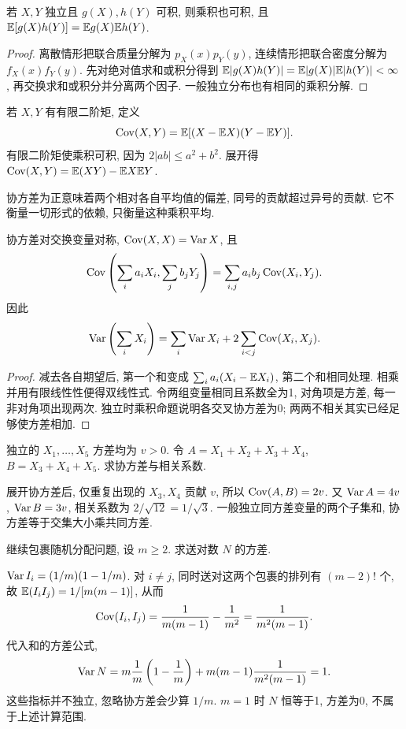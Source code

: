 \begin{proposition}[独立变量的乘积]
若 $X,Y$ 独立且 $g(X),h(Y)$ 可积, 则乘积也可积, 且
$\mathbb E[g(X)h(Y)]=\mathbb E g(X)\mathbb E h(Y)$.
\end{proposition}
\begin{proof}
离散情形把联合质量分解为 $p_X(x)p_Y(y)$, 连续情形把联合密度分解为 $f_X(x)f_Y(y)$. 先对绝对值求和或积分得到 $\mathbb E|g(X)h(Y)|=\mathbb E|g(X)|\mathbb E|h(Y)|<\infty$, 再交换求和或积分并分离两个因子. 一般独立分布也有相同的乘积分解.
\end{proof}
\begin{definition}[协方差]
若 $X,Y$ 有有限二阶矩, 定义
\[\operatorname{Cov}(X,Y)=\mathbb E[(X-\mathbb E X)(Y-\mathbb E Y)].\]
有限二阶矩使乘积可积, 因为 $2|ab|\le a^2+b^2$. 展开得
$\operatorname{Cov}(X,Y)=\mathbb E(XY)-\mathbb E X\mathbb E Y$.
\end{definition}
协方差为正意味着两个相对各自平均值的偏差, 同号的贡献超过异号的贡献. 它不衡量一切形式的依赖, 只衡量这种乘积平均.
\begin{proposition}[双线性与方差公式]
协方差对交换变量对称, $\operatorname{Cov}(X,X)=\operatorname{Var} X$, 且
\[
\operatorname{Cov}\left(\sum_i a_iX_i,\sum_j b_jY_j\right)
=\sum_{i,j}a_ib_j\operatorname{Cov}(X_i,Y_j).
\]
因此
\[\operatorname{Var}\left(\sum_iX_i\right)=\sum_i\operatorname{Var} X_i+2\sum_{i<j}\operatorname{Cov}(X_i,X_j).\]
\end{proposition}
\begin{proof}
减去各自期望后, 第一个和变成 $\sum_i a_i(X_i-\mathbb E X_i)$, 第二个和相同处理. 相乘并用有限线性性便得双线性式. 令两组变量相同且系数全为1, 对角项是方差, 每一非对角项出现两次. 独立时乘积命题说明各交叉协方差为0; 两两不相关其实已经足够使方差相加.
\end{proof}
\begin{example}
独立的 $X_1,\ldots,X_5$ 方差均为 $v>0$. 令 $A=X_1+X_2+X_3+X_4$, $B=X_3+X_4+X_5$. 求协方差与相关系数.
\end{example}
\begin{solution}
展开协方差后, 仅重复出现的 $X_3,X_4$ 贡献 $v$, 所以 $\operatorname{Cov}(A,B)=2v$. 又 $\operatorname{Var} A=4v$, $\operatorname{Var} B=3v$, 相关系数为 $2/\sqrt{12}=1/\sqrt3$. 一般独立同方差变量的两个子集和, 协方差等于交集大小乘共同方差.
\end{solution}
\begin{example}
继续包裹随机分配问题, 设 $m\ge2$. 求送对数 $N$ 的方差.
\end{example}
\begin{solution}
$\operatorname{Var} I_i=(1/m)(1-1/m)$. 对 $i\ne j$, 同时送对这两个包裹的排列有 $(m-2)!$ 个, 故 $\mathbb E(I_iI_j)=1/[m(m-1)]$, 从而
\[\operatorname{Cov}(I_i,I_j)=\frac1{m(m-1)}-\frac1{m^2}=\frac1{m^2(m-1)}.\]
代入和的方差公式,
\[\operatorname{Var} N=m\frac1m\left(1-\frac1m\right)+m(m-1)\frac1{m^2(m-1)}=1.\]
这些指标并不独立, 忽略协方差会少算 $1/m$. $m=1$ 时 $N$ 恒等于1, 方差为0, 不属于上述计算范围.
\end{solution}


